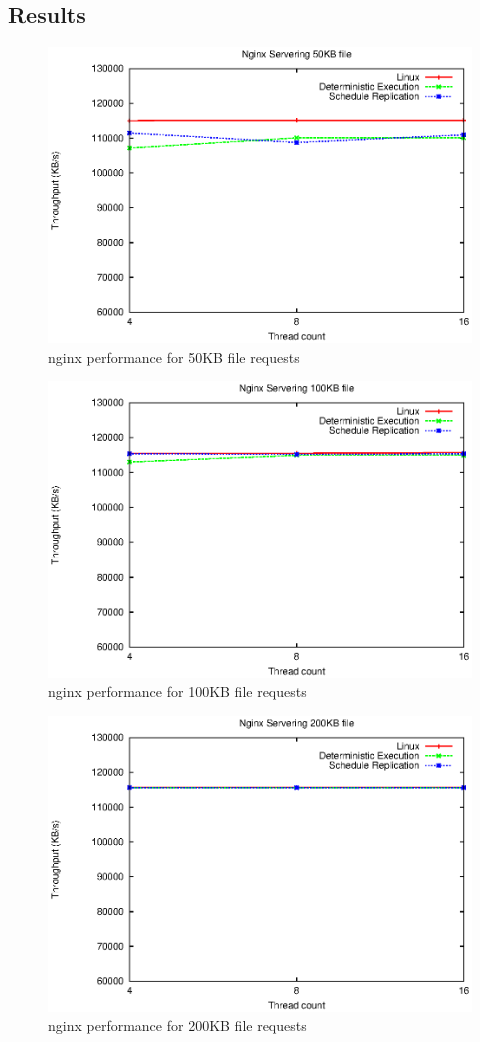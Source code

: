 \subsection{Results}
\begin{figure}
\centering
\includegraphics[width=0.7\columnwidth]{figures/ng_throughput_50k}
\caption{nginx performance for 50KB file requests}
\label{f:ng_50k}
\end{figure}
\begin{figure}
\centering
\includegraphics[width=0.7\columnwidth]{figures/ng_throughput_100k}
\caption{nginx performance for 100KB file requests}
\label{f:ng_100k}
\end{figure}
\begin{figure}
\centering
\includegraphics[width=0.7\columnwidth]{figures/ng_throughput_200k}
\caption{nginx performance for 200KB file requests}
\label{f:ng_200k}
\end{figure}

